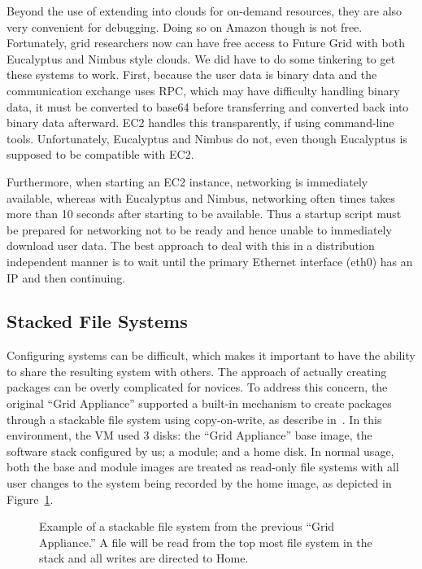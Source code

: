 Beyond the use of extending into clouds for on-demand resources, they are also
very convenient for debugging.  Doing so on Amazon though is not free.
Fortunately, grid researchers now can have free access to Future Grid with both
Eucalyptus and Nimbus style clouds.  We did have to do some tinkering to get
these systems to work.  First, because the user data is binary data and the
communication exchange uses RPC, which may have difficulty handling binary
data, it must be converted to base64 before transferring and converted back
into binary data afterward.  EC2 handles this transparently, if using
command-line tools.  Unfortunately, Eucalyptus and Nimbus do not, even though
Eucalyptus is supposed to be compatible with EC2.

Furthermore, when starting an EC2 instance, networking is immediately
available, whereas with Eucalyptus and Nimbus, networking often times takes
more than 10 seconds after starting to be available. Thus a startup script must
be prepared for networking not to be ready and hence unable to immediately
download user data.  The best approach to deal with this in a distribution
independent manner is to wait until the primary Ethernet interface (eth0) has
an IP and then continuing.

\subsection{Stacked File Systems}

Configuring systems can be difficult, which makes it important to have the
ability to share the resulting system with others.  The approach of actually
creating packages can be overly complicated for novices.  To address this
concern, the original ``Grid Appliance'' supported a built-in mechanism to
create packages through a stackable file system using copy-on-write, as
describe in~\cite{vtdc}.  In this environment, the VM used 3 disks: the ``Grid
Appliance'' base image, the software stack configured by us; a module; and a
home disk.  In normal usage, both the base and module images are treated as
read-only file systems with all user changes to the system being recorded by
the home image, as depicted in Figure~\ref{fig:stackfs}.

\begin{figure}
\centering
{}
\caption[Grid Appliance stackable file system]{Example of a stackable file
system from the previous ``Grid Appliance.''  A file will be read from the top
most file system in the stack and all writes are directed to Home.}
\label{fig:stackfs}
\end{figure}

